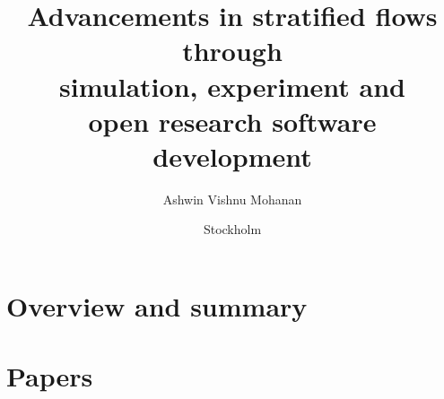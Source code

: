 \documentclass{./templates/mechthesis/MechThesis}
\title[%
  Advancements in stratified flows through simulation, experiment and open research software development%
]%
{%
  Advancements in stratified flows through \\ simulation, experiment and \\ open
  research software development%
}%
\author{Ashwin Vishnu Mohanan}%
\affiliation
{%
	Department of Mechanics, KTH Royal Institute of Technology,\\
	SE--100 44 Stockholm, Sweden%
}%
\date{Stockholm}{{August}}{{2019}}%
\begin{document}
%
\frontmatter



\printglossary
\printglossary[type=\acronymtype]
%
\mainmatter


\part{Overview and summary}

%
\begin{refsection}
  
\end{refsection}

%


%
\part{Papers}

%
\makepapersummary
\cleardoublepage

%


\begin{refsection}
 
\end{refsection}

\begin{refsection}
 
\end{refsection}

\begin{refsection}
 
\end{refsection}
\end{document}
